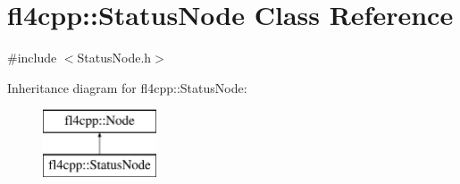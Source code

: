 \hypertarget{classfl4cpp_1_1_status_node}{}\section{fl4cpp\+:\+:Status\+Node Class Reference}
\label{classfl4cpp_1_1_status_node}


{\ttfamily \#include $<$Status\+Node.\+h$>$}

Inheritance diagram for fl4cpp\+:\+:Status\+Node\+:\begin{figure}[H]
\begin{center}
\leavevmode
\includegraphics[height=2.000000cm]{classfl4cpp_1_1_status_node}
\end{center}
\end{figure}
